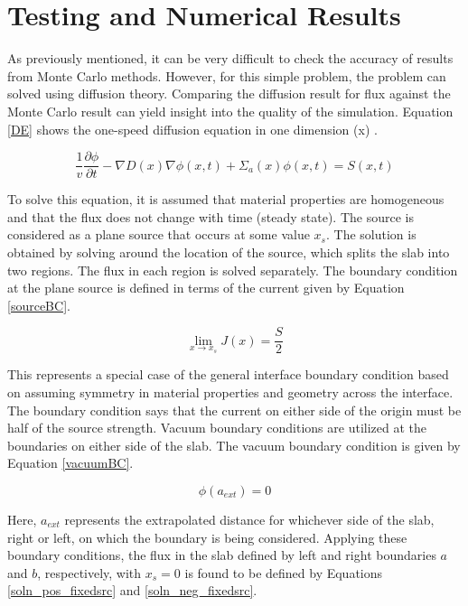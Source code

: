 \documentclass[11pt, oneside]{article}   	%
\begin{document}
\section{Testing and Numerical Results}

As previously mentioned, it can be very difficult to check the accuracy of results from Monte Carlo methods. However, for this simple problem, the problem can solved using diffusion theory. Comparing the diffusion result for flux against the Monte Carlo result can yield insight into the quality of the simulation. Equation \ref{DE} shows the one-speed diffusion equation in one dimension (x) \cite{duderstadt}.

\begin{equation}
\label{DE}
\frac{1}{v}\frac{\partial \phi}{\partial t} - \nabla D(x) \nabla \phi (x,t)+\Sigma_a (x) \phi (x,t) = S(x,t)
\end{equation}

To solve this equation, it is assumed that material properties are homogeneous and that the flux does not change with time (steady state). The source is considered as a plane source that occurs at some value $x_{s}$. The solution is obtained by solving around the location of the source, which splits the slab into two regions. The flux in each region is solved separately. The boundary condition at the plane source is defined in terms of the current given by Equation \ref{sourceBC}.

\begin{equation}
\label{sourceBC}
\lim_{x \to x_{s}}J(x) = \frac{S}{2}
\end{equation}

This represents a special case of the general interface boundary condition based on assuming symmetry in material properties and geometry across the interface. The boundary condition says that the current on either side of the origin must be half of the source strength. Vacuum boundary conditions are utilized at the boundaries on either side of the slab. The vacuum boundary condition is given by Equation \ref{vacuumBC}.

\begin{equation}
\label{vacuumBC}
\phi (a_{ext})=0
\end{equation}

Here, $a_{ext}$ represents the extrapolated distance for whichever side of the slab, right or left, on which the boundary is being considered. Applying these boundary conditions, the flux in the slab defined by left and right boundaries $a$ and $b$, respectively, with $x_{s} = 0$ is found to be defined by Equations \ref{soln_pos_fixedsrc} and \ref{soln_neg_fixedsrc}.
\end{document}
